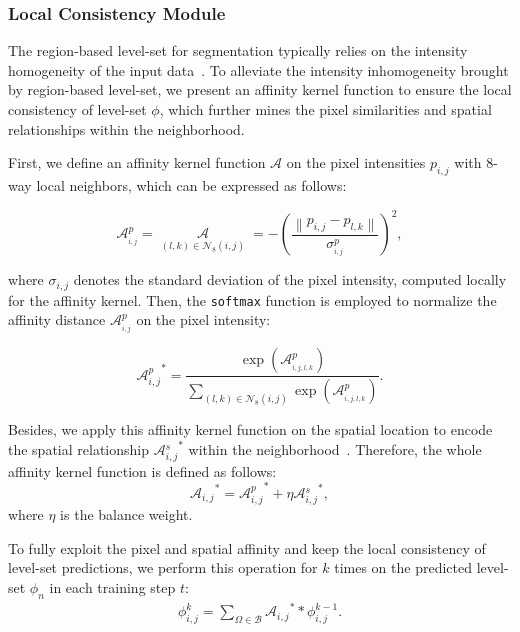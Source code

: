 \documentclass[12pt,onecolumn,letterpaper]{article}
\begin{document}
\subsubsection{Local Consistency Module}
The region-based level-set for segmentation typically relies on the intensity homogeneity of the input data~\cite{CVPR2007implicit, tip2011level, tip2019mumford}. 
To alleviate the intensity inhomogeneity brought by region-based level-set,
we present an affinity kernel function to ensure the local consistency of level-set $\phi$, which further mines the pixel similarities 
and spatial relationships within the neighborhood.

First, we define an affinity kernel function $\mathcal{A}$ on the pixel intensities $p_{i,j}$ with 8-way local neighbors, which can be expressed as follows:
\begin{small}
	\begin{equation}
		\mathcal{A}_{_{i,j}}^p = \mathop {\mathcal{A} \left( {{p_{i,j}},{p_{l,k}}} \right)}\limits_{(l,k) \in \mathcal{N}_8(i,j)}  =  - {\left( {\frac{{\left\| {{p_{i,j}} - {p_{l,k}}} \right\|}}{{\sigma _{_{i,j}}^p}}} \right)^2},
	\end{equation}
\end{small}

\noindent 
where ${\sigma _{i,j}}$ denotes the standard deviation of the pixel intensity, computed locally for the affinity kernel. Then, the \texttt{softmax} function is employed to normalize the affinity distance $\mathcal{A}_{_{i,j}}^p$ on the pixel intensity:
\begin{small}
	\begin{equation}
		{\mathcal{A} {_{i,j}^p}^*} = \frac{{\exp (\mathcal{A} _{_{i,j,l,k}}^p)}}{{\sum\limits_{(l,k) \in \mathcal{N}_8(i,j)} {\exp (\mathcal{A} _{_{i,j,l,k}}^p)} }}.
	\end{equation}
\end{small}

\noindent Besides, we apply this affinity kernel function on the spatial location to encode the spatial relationship ${\mathcal{A}{_{i,j}^s}^*}$ within the neighborhood~\cite{ru2022learning}. Therefore, the whole affinity kernel function is defined as follows:
\begin{equation} \label{affinity}
	{\mathcal{A} _{i,j}}^* = {\mathcal{A} {_{i,j}^p}^*} + \eta \mathcal{A} {_{i,j}^s}^*,
\end{equation}
where $\eta$ is the balance weight.

To fully exploit the pixel and spatial affinity and keep the local consistency of level-set predictions, we perform this operation for $k$ times on the predicted level-set $\phi_n$ in each training step $t$:
\begin{equation}
	\begin{aligned}
		\phi _{i,j}^k = \sum\limits_{\Omega \in \mathcal{B}} {{\mathcal{A} _{i,j}}}^*  * \phi _{i,j}^{k - 1}.
	\end{aligned}
\end{equation}
\end{document}
